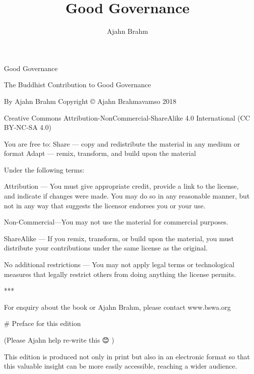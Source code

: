 \documentclass[12pt, openany]{book}
\title{Good Governance}
\author{Ajahn Brahm}
\date{}
\begin{document}
\frontmatter
\pagestyle{empty}
\newpage
\begin{center}\end{center}
\vspace{9em}
\begin{center}\begin{Large}\begin{sc}Good Governance\end{sc}\end{Large}\end{center}



\newpage










The Buddhist Contribution to Good Governance

By
Ajahn Brahm
Copyright © Ajahn Brahmavamso 2018

Creative Commons Attribution-NonCommercial-ShareAlike 4.0 International (CC BY-NC-SA 4.0)

You are free to:
Share — copy and redistribute the material in any medium or format
Adapt — remix, transform, and build upon the material

Under the following terms:

Attribution — You must give appropriate credit, provide a link to the license, and indicate if changes were made. You may do so in any reasonable manner, but not in any way that suggests the licensor endorses you or your use.

Non-Commercial—You may not use the material for commercial purposes.

ShareAlike — If you remix, transform, or build upon the material, you must distribute your contributions under the same license as the original.

No additional restrictions — You may not apply legal terms or technological measures that legally restrict others from doing anything the license permits.

***

For enquiry about the book or Ajahn Brahm, please contact www.bswa.org







# Preface for this edition

(Please Ajahn help re-write this  😊 )

This edition is produced not only in print but also in an electronic format so that this valuable insight can be more easily accessible, reaching a wider audience.
\end{document}
